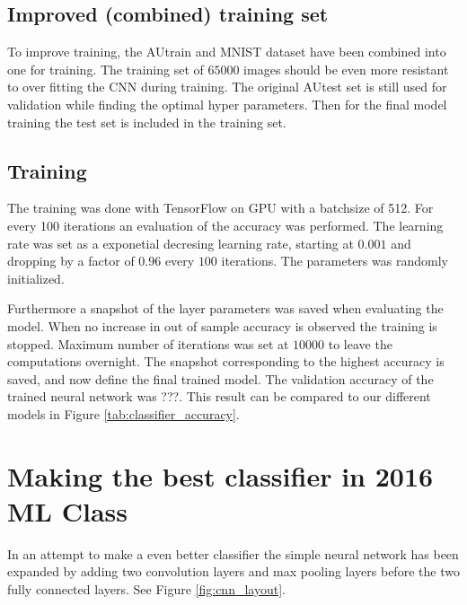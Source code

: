 \documentclass[a4paper,10pt,article,oneside,english]{memoir}
\begin{document}
	\section{Improved (combined) training set}
	To improve training, the AUtrain and MNIST dataset have been combined into one for training. The training set of $65000$ images should be even more resistant to over fitting the CNN during training. 
	The original AUtest set is still used for validation while finding the optimal hyper parameters. Then for the final model training the test set is included in the training set. 
	
	\section{Training}
	
	The training was done with TensorFlow on GPU with a batchsize of 512. For every 100 iterations an evaluation of the accuracy was performed. 
	The learning rate was set as a exponetial decresing learning rate, starting at $0.001$ and dropping by a factor of $0.96$ every $100$ iterations. The parameters was randomly initialized.
	
	
	Furthermore a snapshot of the layer parameters was saved when evaluating the model. When no increase in out of sample accuracy is observed the training is stopped. Maximum number of iterations was set at $10000$ to leave the computations overnight. The snapshot corresponding to the highest accuracy is saved, and now define the final trained model. The validation accuracy of the trained neural network was ???. This result can be compared to our different models in Figure \ref{tab:classifier_accuracy}.
	
	
	
	
	
	
	
	
	
	
	\chapter{Making the best classifier in 2016 ML Class}
	In an attempt to make a even better classifier the simple neural network has been expanded by adding two convolution layers and max pooling layers before the two fully connected layers. See Figure \ref{fig:cnn_layout}.
	
\end{document}
